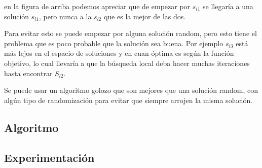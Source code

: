 en la figura de arriba podemos apreciar que de empezar por $s_{i1}$ se llegar\'ia a una soluci\'on $s_{l1}$, pero nunca a la $s_{l2}$ que es la mejor de las dos.

Para evitar esto se puede empezar por alguna soluci\'on random, pero esto tiene el problema que es poco probable que la soluci\'on sea buena. Por ejemplo $s_{i3}$ est\'a m\'as lejos en el espacio de soluciones y en cuan \'optima es seg\'un la funci\'on objetivo, lo cual llevar\'ia a que la b\'usqueda local deba hacer muchas iteraciones hasta encontrar $S_{l2}$.

Se puede usar un algoritmo golozo que son mejores que una soluci\'on random, con alg\'un tipo de randomizaci\'on para evitar que siempre arrojen la misma soluci\'on.

\subsection{Algoritmo}



\subsection{Experimentaci\'on}
